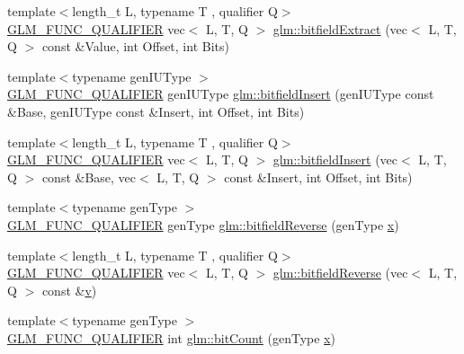 \begin{DoxyCompactItemize}
\item 
{\footnotesize template$<$length\+\_\+t L, typename T , qualifier Q$>$ }\\\hyperlink{setup_8hpp_a33fdea6f91c5f834105f7415e2a64407}{G\+L\+M\+\_\+\+F\+U\+N\+C\+\_\+\+Q\+U\+A\+L\+I\+F\+I\+ER} vec$<$ L, T, Q $>$ \hyperlink{group__core__func__integer_ga346b25ab11e793e91a4a69c8aa6819f2}{glm\+::bitfield\+Extract} (vec$<$ L, T, Q $>$ const \&Value, int Offset, int Bits)
\item 
{\footnotesize template$<$typename gen\+I\+U\+Type $>$ }\\\hyperlink{setup_8hpp_a33fdea6f91c5f834105f7415e2a64407}{G\+L\+M\+\_\+\+F\+U\+N\+C\+\_\+\+Q\+U\+A\+L\+I\+F\+I\+ER} gen\+I\+U\+Type \hyperlink{namespaceglm_acec32bd3c6eb5719c5aea5b423085ae6}{glm\+::bitfield\+Insert} (gen\+I\+U\+Type const \&Base, gen\+I\+U\+Type const \&Insert, int Offset, int Bits)
\item 
{\footnotesize template$<$length\+\_\+t L, typename T , qualifier Q$>$ }\\\hyperlink{setup_8hpp_a33fdea6f91c5f834105f7415e2a64407}{G\+L\+M\+\_\+\+F\+U\+N\+C\+\_\+\+Q\+U\+A\+L\+I\+F\+I\+ER} vec$<$ L, T, Q $>$ \hyperlink{group__core__func__integer_ga2e82992340d421fadb61a473df699b20}{glm\+::bitfield\+Insert} (vec$<$ L, T, Q $>$ const \&Base, vec$<$ L, T, Q $>$ const \&Insert, int Offset, int Bits)
\item 
{\footnotesize template$<$typename gen\+Type $>$ }\\\hyperlink{setup_8hpp_a33fdea6f91c5f834105f7415e2a64407}{G\+L\+M\+\_\+\+F\+U\+N\+C\+\_\+\+Q\+U\+A\+L\+I\+F\+I\+ER} gen\+Type \hyperlink{namespaceglm_abaf011115ec2807a589806911d97c10e}{glm\+::bitfield\+Reverse} (gen\+Type \hyperlink{_s_d_l__opengl_8h_ad0e63d0edcdbd3d79554076bf309fd47}{x})
\item 
{\footnotesize template$<$length\+\_\+t L, typename T , qualifier Q$>$ }\\\hyperlink{setup_8hpp_a33fdea6f91c5f834105f7415e2a64407}{G\+L\+M\+\_\+\+F\+U\+N\+C\+\_\+\+Q\+U\+A\+L\+I\+F\+I\+ER} vec$<$ L, T, Q $>$ \hyperlink{group__core__func__integer_ga750a1d92464489b7711dee67aa3441b6}{glm\+::bitfield\+Reverse} (vec$<$ L, T, Q $>$ const \&\hyperlink{_s_d_l__opengl_8h_a10a82eabcb59d2fcd74acee063775f90}{v})
\item 
{\footnotesize template$<$typename gen\+Type $>$ }\\\hyperlink{setup_8hpp_a33fdea6f91c5f834105f7415e2a64407}{G\+L\+M\+\_\+\+F\+U\+N\+C\+\_\+\+Q\+U\+A\+L\+I\+F\+I\+ER} int \hyperlink{group__core__func__integer_ga44abfe3379e11cbd29425a843420d0d6}{glm\+::bit\+Count} (gen\+Type \hyperlink{_s_d_l__opengl_8h_ad0e63d0edcdbd3d79554076bf309fd47}{x})

\end{DoxyCompactItemize}
